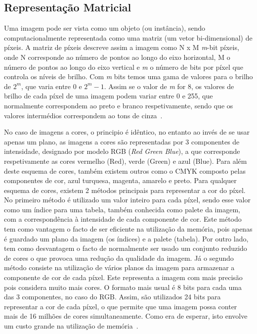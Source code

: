 \subsection{Representação Matricial} \label{subsec:matrix}

Uma imagem pode ser vista como um objeto (ou instância), sendo computacionalmente representada como uma matriz (um vetor bi-dimensional) de píxeis. A matriz de píxeis descreve assim a imagem como N x M \textit{m}-bit píxeis, onde N corresponde ao número de pontos ao longo do eixo horizontal, M o número de pontos ao longo do eixo vertical e \textit{m} o número de bits por píxel que controla os níveis de brilho. Com \textit{m} bits temos uma gama de valores para o brilho de $ 2^m $, que varia entre 0 e $ 2^m - 1 $. Assim se o valor de \textit{m} for 8, os valores de brilho de cada píxel de uma imagem podem variar entre 0 e 255, que normalmente correspondem ao preto e branco respetivamente, sendo que os valores intermédios correspondem ao tons de cinza~\citet{Nixon2002}.

No caso de imagens a cores, o principio é idêntico, no entanto ao invés de se usar apenas um plano, as imagens a cores são representadas por 3 componentes de intensidade, designado por modelo RGB (\textit{Red Green Blue}), a que corresponde respetivamente as cores vermelho (Red), verde (Green) e azul (Blue). Para além deste esquema de cores, também existem outros como o CMYK composto pelas componentes de cor, azul turquesa, magenta, amarelo e preto. Para qualquer esquema de cores, existem 2 métodos principais para representar a cor do píxel. No primeiro método é utilizado um valor inteiro para cada píxel, sendo esse valor como um índice para uma tabela, também conhecida como palete da imagem, com a correspondência à intensidade de cada componente de cor. Este método tem como vantagem o facto de ser eficiente na utilização da memória, pois apenas é guardado um plano da imagem (os índices) e a palete (tabela). Por outro lado, tem como desvantagem o facto de normalmente ser usado um conjunto reduzido de cores o que provoca uma redução da qualidade da imagem. Já o segundo método consiste na utilização de vários planos da imagem para armazenar a componente de cor de cada píxel. Este representa a imagem com mais precisão pois considera muito mais cores. O formato mais usual é 8 bits para cada uma das 3 componentes, no caso do RGB. Assim, são utilizados 24 bits para representar a cor de cada píxel, o que permite que uma imagem possa conter mais de 16 milhões de cores simultaneamente. Como era de esperar, isto envolve um custo grande na utilização de memória~\citet{Nixon2002}.


